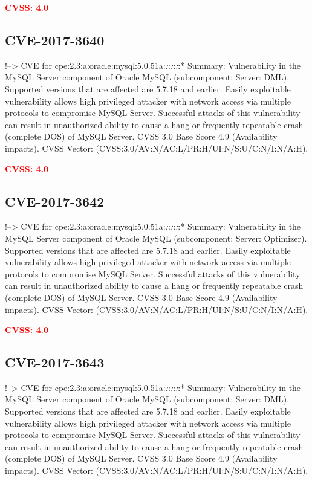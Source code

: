 \documentclass[a4paper, 12pt]{article}
\begin{document}
\textbf{\textcolor{red}{CVSS: 4.0}}

\hypertarget{cve-2017-3640}{%
\subsection{CVE-2017-3640}\label{cve-2017-3640}}

!--\textgreater{} CVE for
cpe:2.3:a:oracle:mysql:5.0.51a:\emph{:}:\emph{:}:\emph{:}:* Summary:
Vulnerability in the MySQL Server component of Oracle MySQL
(subcomponent: Server: DML). Supported versions that are affected are
5.7.18 and earlier. Easily exploitable vulnerability allows high
privileged attacker with network access via multiple protocols to
compromise MySQL Server. Successful attacks of this vulnerability can
result in unauthorized ability to cause a hang or frequently repeatable
crash (complete DOS) of MySQL Server. CVSS 3.0 Base Score 4.9
(Availability impacts). CVSS Vector:
(CVSS:3.0/AV:N/AC:L/PR:H/UI:N/S:U/C:N/I:N/A:H).

\textbf{\textcolor{red}{CVSS: 4.0}}

\hypertarget{cve-2017-3642}{%
\subsection{CVE-2017-3642}\label{cve-2017-3642}}

!--\textgreater{} CVE for
cpe:2.3:a:oracle:mysql:5.0.51a:\emph{:}:\emph{:}:\emph{:}:* Summary:
Vulnerability in the MySQL Server component of Oracle MySQL
(subcomponent: Server: Optimizer). Supported versions that are affected
are 5.7.18 and earlier. Easily exploitable vulnerability allows high
privileged attacker with network access via multiple protocols to
compromise MySQL Server. Successful attacks of this vulnerability can
result in unauthorized ability to cause a hang or frequently repeatable
crash (complete DOS) of MySQL Server. CVSS 3.0 Base Score 4.9
(Availability impacts). CVSS Vector:
(CVSS:3.0/AV:N/AC:L/PR:H/UI:N/S:U/C:N/I:N/A:H).

\textbf{\textcolor{red}{CVSS: 4.0}}

\hypertarget{cve-2017-3643}{%
\subsection{CVE-2017-3643}\label{cve-2017-3643}}

!--\textgreater{} CVE for
cpe:2.3:a:oracle:mysql:5.0.51a:\emph{:}:\emph{:}:\emph{:}:* Summary:
Vulnerability in the MySQL Server component of Oracle MySQL
(subcomponent: Server: DML). Supported versions that are affected are
5.7.18 and earlier. Easily exploitable vulnerability allows high
privileged attacker with network access via multiple protocols to
compromise MySQL Server. Successful attacks of this vulnerability can
result in unauthorized ability to cause a hang or frequently repeatable
crash (complete DOS) of MySQL Server. CVSS 3.0 Base Score 4.9
(Availability impacts). CVSS Vector:
(CVSS:3.0/AV:N/AC:L/PR:H/UI:N/S:U/C:N/I:N/A:H).
\end{document}
